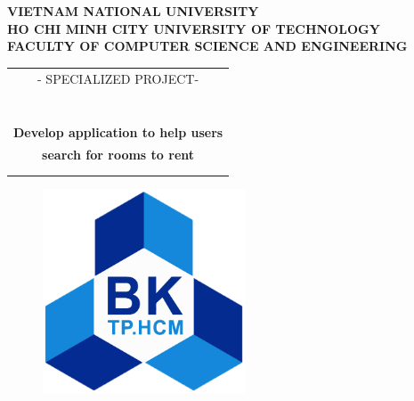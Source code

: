\documentclass[16pt]{report}
\begin{document}
\setlength{\parindent}{0pt}




\begin{titlepage}
\begin{center}
\textbf{\fontsize{13pt}{18pt}\selectfont VIETNAM NATIONAL UNIVERSITY}\\
\textbf{\fontsize{13pt}{18pt}\selectfont HO CHI MINH CITY UNIVERSITY OF TECHNOLOGY}\\
\textbf{\fontsize{13pt}{18pt}\selectfont FACULTY OF COMPUTER SCIENCE AND ENGINEERING}
\end{center}

\vspace{1cm}

\begin{center}
\begin{tabular}{c}
{\fontsize{13pt}{18pt}\selectfont - SPECIALIZED PROJECT- }\\
~~\\
\hline
\\
\\
\textbf{{\huge Develop application to help users}}\\
\textbf{{\huge search for rooms to rent }}\\
\\
\\
\hline
\end{tabular}
\end{center}

\vspace{1cm}

\begin{figure}[h!]
\begin{center}
\includegraphics[width=6cm]{Images/BK.png}
\end{center}
\end{figure}




\end{titlepage}
\end{document}
